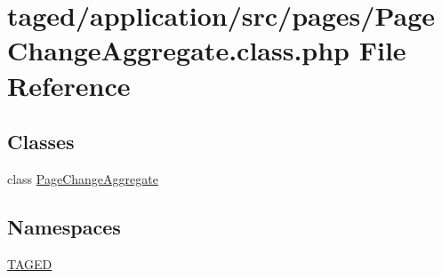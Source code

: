 \hypertarget{_page_change_aggregate_8class_8php}{}\section{taged/application/src/pages/\+Page\+Change\+Aggregate.class.\+php File Reference}
\label{_page_change_aggregate_8class_8php}
\subsection*{Classes}
\begin{DoxyCompactItemize}
\item 
class \hyperlink{class_page_change_aggregate}{Page\+Change\+Aggregate}
\end{DoxyCompactItemize}
\subsection*{Namespaces}
\begin{DoxyCompactItemize}
\item 
 \hyperlink{namespace_t_a_g_e_d}{T\+A\+G\+ED}
\end{DoxyCompactItemize}
